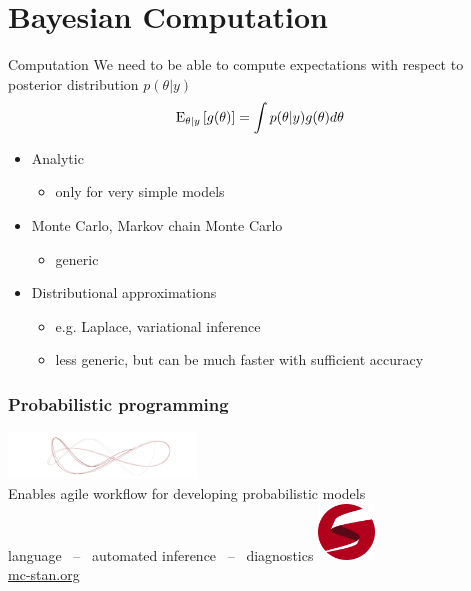 \documentclass[10pt]{beamer}
\begin{document}
\section{Bayesian Computation}
\frame{\sectionpage}

\begin{frame}{Computation}
  We need to be able to compute expectations with respect to posterior
  distribution $p(\theta|y)$
  \begin{align*}
    \mathrm{E}_{\theta|y}\left[ g(\theta) \right] = \int p(\theta|y)g(\theta) d\theta
  \end{align*}

  \begin{itemize}
  \item Analytic
    \begin{itemize}
    \item only for very simple models
    \end{itemize}
  \item Monte Carlo, Markov chain Monte Carlo
    \begin{itemize}
    \item generic
    \end{itemize}
  \item Distributional approximations
    \begin{itemize}
    \item e.g. Laplace, variational inference
    \item less generic, but can be much faster with sufficient accuracy
    \end{itemize}
  \end{itemize}
\end{frame}

\begin{frame}

  \frametitle{Probabilistic programming}

  \begin{center}
   \vspace{-\baselineskip}
    \includegraphics[width=5cm]{figs/wide_ensemble.png}\\
   \vspace{2\baselineskip}
  {\large Enables agile workflow for developing probabilistic models}\\
   \vspace{\baselineskip}
   language \, -- \,
   automated inference \, -- \,
   diagnostics
   \vspace{\baselineskip}
  \vfill
    \includegraphics[width=1.5cm]{figs/stan_logo_wide.png}\\
    \url{mc-stan.org}
  \end{center}

\end{frame}
\end{document}
